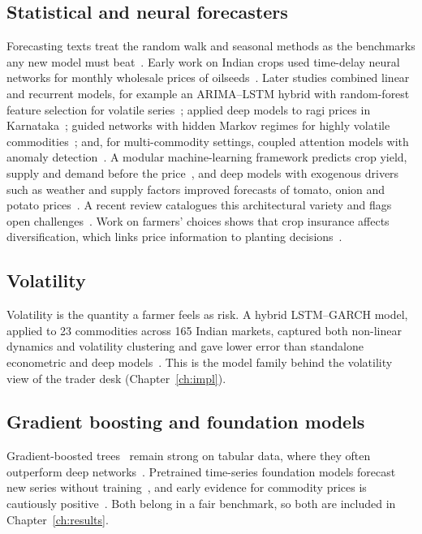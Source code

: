 \subsection*{Statistical and neural forecasters}
Forecasting texts treat the random walk and seasonal methods as the benchmarks any new model must beat~\cite{hyndman2021}. Early work on Indian crops used time-delay neural networks for monthly wholesale prices of oilseeds~\cite{jha2014}. Later studies combined linear and recurrent models, for example an ARIMA--LSTM hybrid with random-forest feature selection for volatile series~\cite{ray2023}; applied deep models to ragi prices in Karnataka~\cite{meena2024}; guided networks with hidden Markov regimes for highly volatile commodities~\cite{avinash2024}; and, for multi-commodity settings, coupled attention models with anomaly detection~\cite{sediyono2025}. A modular machine-learning framework predicts crop yield, supply and demand before the price~\cite{mohanty2023}, and deep models with exogenous drivers such as weather and supply factors improved forecasts of tomato, onion and potato prices~\cite{exogenous2024}. A recent review catalogues this architectural variety and flags open challenges~\cite{wu2026}. Work on farmers' choices shows that crop insurance affects diversification, which links price information to planting decisions~\cite{crop_ins}.

\subsection*{Volatility}
Volatility is the quantity a farmer feels as risk. A hybrid LSTM--GARCH model, applied to 23 commodities across 165 Indian markets, captured both non-linear dynamics and volatility clustering and gave lower error than standalone econometric and deep models~\cite{manogna2025}. This is the model family behind the volatility view of the trader desk (Chapter~\ref{ch:impl}).

\subsection*{Gradient boosting and foundation models}
Gradient-boosted trees~\cite{chen2016,ke2017} remain strong on tabular data, where they often outperform deep networks~\cite{grinsztajn2022}. Pretrained time-series foundation models forecast new series without training~\cite{ansari2024}, and early evidence for commodity prices is cautiously positive~\cite{wang2026}. Both belong in a fair benchmark, so both are included in Chapter~\ref{ch:results}.

